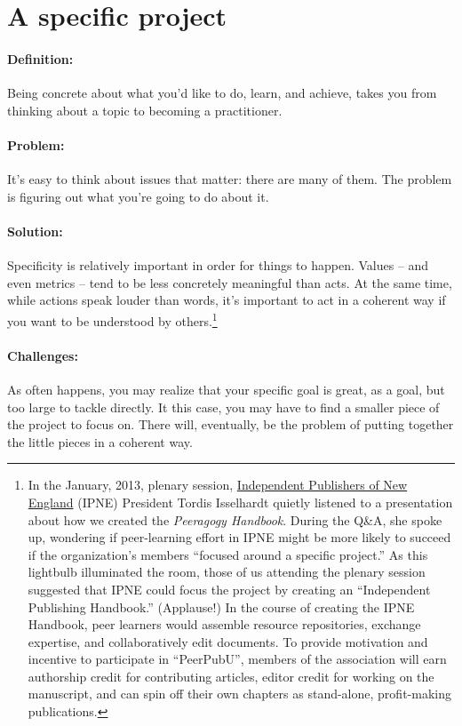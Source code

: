 \section{A specific project}
\paragraph{Definition:} Being concrete about what you'd like to do, learn,
and achieve, takes you from thinking about a topic to becoming a
practitioner.

\paragraph{Problem:} It's easy to think about issues that matter: there are
many of them. The problem is figuring out what you're going to do about
it.

\paragraph{Solution:} Specificity is relatively important in order for
things to happen. Values -- and even metrics -- tend to be less
concretely meaningful than acts. At the same time, while actions speak
louder than words, it's important to act in a coherent way if you want
to be understood by others.\footnote{In the January, 2013, plenary
session, \href{http://ipne.org}{Independent Publishers of New England}
(IPNE) President Tordis Isselhardt quietly listened to a presentation
about how we created the \emph{Peeragogy Handbook}. During the Q\&A, she
spoke up, wondering if peer-learning effort in IPNE might be more likely
to succeed if the organization's members ``focused around a specific
project.'' As this lightbulb illuminated the room, those of us attending
the plenary session suggested that IPNE could focus the project by
creating an ``Independent Publishing Handbook.'' (Applause!) In the
course of creating the IPNE Handbook, peer learners would assemble
resource repositories, exchange expertise, and collaboratively edit
documents. To provide motivation and incentive to participate in
``PeerPubU'', members of the association will earn authorship credit for
contributing articles, editor credit for working on the manuscript, and
can spin off their own chapters as stand-alone, profit-making
publications.}

\paragraph{Challenges:} As often happens, you may realize that your
specific goal is great, as a goal, but too large to tackle directly. It
this case, you may have to find a smaller piece of the project to focus
on. There will, eventually, be the problem of putting together the
little pieces in a coherent way.


